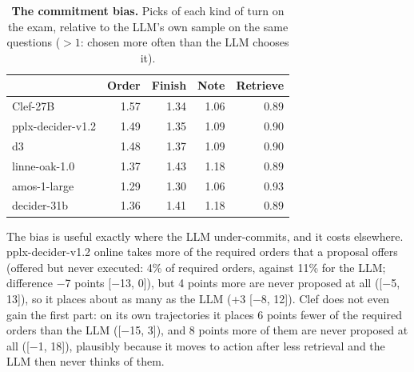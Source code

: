 \documentclass[11pt]{article}
\begin{document}
\begin{table}[t]
\centering\small
\begin{tabular}{@{}lrrrr@{}}\toprule
& Order & Finish & Note & Retrieve \\\midrule
Clef-27B & 1.57 & 1.34 & 1.06 & 0.89 \\
pplx-decider-v1.2 & 1.49 & 1.35 & 1.09 & 0.90 \\
d3 & 1.48 & 1.37 & 1.09 & 0.90 \\
linne-oak-1.0 & 1.37 & 1.43 & 1.18 & 0.89 \\
amos-1-large & 1.29 & 1.30 & 1.06 & 0.93 \\
decider-31b & 1.36 & 1.41 & 1.18 & 0.89 \\\bottomrule
\end{tabular}
\caption{\textbf{The commitment bias.} Picks of each kind of turn on the exam, relative to the LLM's own sample on the
same questions ($>1$: chosen more often than the LLM chooses it).}
\label{tab:commit}
\end{table}

The bias is useful exactly where the LLM under-commits, and it costs elsewhere. pplx-decider-v1.2 online takes more
of the required orders that a proposal offers (offered but never executed: 4\% of required orders, against 11\% for
the LLM; difference $-$7 points [$-$13, 0]), but 4 points more are never proposed at all ([$-$5, 13]), so it places
about as many as the LLM (+3 [$-$8, 12]). Clef does not even gain the first part: on its own trajectories it places 6 points fewer of the required orders than
the LLM ([$-$15, 3]), and 8 points more of them are never proposed at all ([$-$1, 18]), plausibly because it moves to
action after less retrieval and the LLM then never thinks of them.
\end{document}
